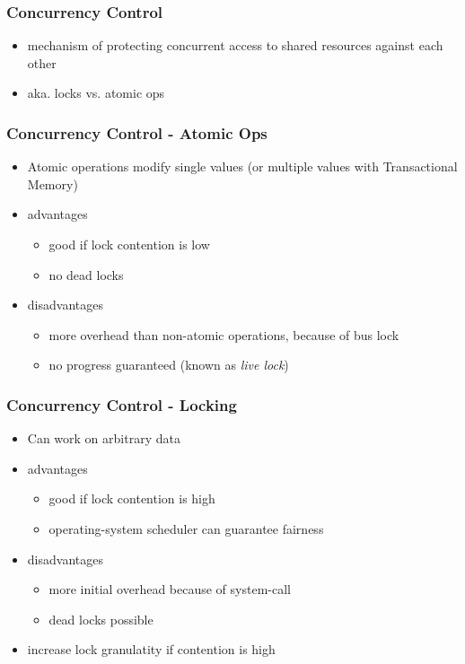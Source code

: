 \begin{frame}
 \frametitle{Concurrency Control}
 \begin{itemize}
  \item mechanism of protecting concurrent access to shared resources against each other
  \item aka. locks vs. atomic ops
 \end{itemize}
\end{frame}

\begin{frame}
 \frametitle{Concurrency Control - Atomic Ops}
 \begin{itemize}
  \item Atomic operations modify single values (or multiple values with Transactional Memory)
  \item advantages
   \begin{itemize}
    \item good if lock contention is low
    \item no dead locks
   \end{itemize}
  \item disadvantages
   \begin{itemize}
    \item more overhead than non-atomic operations, because of bus lock
    \item no progress guaranteed (known as \textit{live lock})
   \end{itemize}
 \end{itemize}
\end{frame}

\begin{frame}
 \frametitle{Concurrency Control - Locking}
 \begin{itemize}
  \item Can work on arbitrary data
  \item advantages
   \begin{itemize}
    \item good if lock contention is high
    \item operating-system scheduler can guarantee fairness
   \end{itemize}
  \item disadvantages
   \begin{itemize}
    \item more initial overhead because of system-call
    \item dead locks possible
   \end{itemize}
  \item increase lock granulatity if contention is high
 \end{itemize}
\end{frame}

